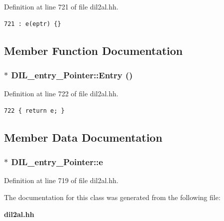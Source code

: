 Definition at line 721 of file dil2al.hh.



\footnotesize\begin{verbatim}721 : e(eptr) {}
\end{verbatim}\normalsize 


\subsection{Member Function Documentation}
\subsubsection{$\ast$ DIL\_\-entry\_\-Pointer::Entry ()\hspace{0.3cm}{\tt  [inline]}}\label{classDIL__entry__Pointer_a1}




Definition at line 722 of file dil2al.hh.



\footnotesize\begin{verbatim}722 { return e; }
\end{verbatim}\normalsize 


\subsection{Member Data Documentation}
\subsubsection{$\ast$ DIL\_\-entry\_\-Pointer::e\hspace{0.3cm}{\tt  [protected]}}\label{classDIL__entry__Pointer_n0}




Definition at line 719 of file dil2al.hh.

The documentation for this class was generated from the following file:\begin{CompactItemize}
\item 
{\bf dil2al.hh}\end{CompactItemize}
